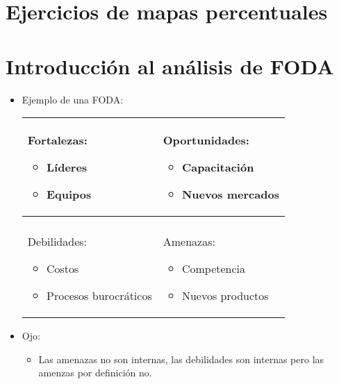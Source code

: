 \section{Ejercicios de mapas percentuales}

\section{Introducción al análisis de FODA}
\begin{itemize}
    \item Ejemplo de una FODA:  
    \begin{center}
       \begin{tabular}{  p{5cm} | p{5cm} }
            Fortalezas: \begin{itemize}
                \item Líderes 
                \item Equipos 
            \end{itemize}            
            & 
            Oportunidades: \begin{itemize}
                \item Capacitación 
                \item Nuevos mercados 
            \end{itemize}    
            \\
            \hline
            \\ 
            Debilidades: \begin{itemize}
                \item Costos 
                \item Procesos burocráticos
            \end{itemize}
            & 
            Amenazas: \begin{itemize}
                \item Competencia 
                \item Nuevos productos
            \end{itemize}
            \\ 
       \end{tabular}
    \end{center}
    
    \item Ojo:
        \begin{itemize}
            \item Las amenazas no son internas, las debilidades son internas pero las amenzas por definición no.
        \end{itemize}
\end{itemize}
